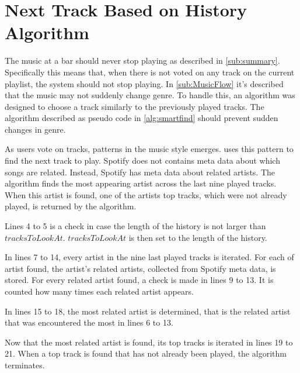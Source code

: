 \section{Next Track Based on History Algorithm}
\label{sec:algorithm}

The music at a bar should never stop playing as described in
\cref{sub:summary}. Specifically this means that, when there is not voted
on any track on the current playlist, the system should not stop
playing. In \cref{sub:MusicFlow} it's described that the music may not
suddenly change genre. To handle this, an algorithm was designed to
choose a track similarly to the previously played tracks. The
algorithm described as pseudo code in \cref{alg:smartfind} should
prevent sudden changes in genre.

As users vote on tracks, patterns in the music style
emerges.  uses this pattern to find the next track
to play. Spotify does not contains meta data about which songs are
related. Instead, Spotify has meta data about related artists. The algorithm finds the most appearing artist across the last nine played tracks. When this artist is found, one of the artists top tracks, which were not already played, is returned by the algorithm.

Lines 4 to 5 is a check in case the length of the history is not larger than $tracksToLookAt$. $tracksToLookAt$ is then set to the length of the history.

In lines 7 to 14, every artist in the nine last played tracks is iterated. For each of artist found, the artist's related artists, collected from Spotify meta data, is stored. For every related artist found, a check is made in lines 9 to 13. It is counted how many times each related artist appears.

In lines 15 to 18, the most related artist is determined, that is the related artist that was encountered the most in lines 6 to 13.

Now that the most related artist is found, its top tracks is iterated in lines 19 to 21. When a top track is found that has not already been played, the algorithm terminates.

